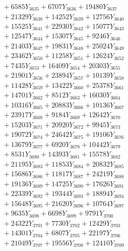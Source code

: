\documentclass[a4paper,10pt]{article}
\begin{document}
{\begin{align}
&\;  + 6585 Y_{3635} + 6707 Y_{3636} + 19480 Y_{3637} \\[0.3ex]
&\;  + 21329 Y_{3638} + 14252 Y_{3639} + 12756 Y_{3640} \\[0.3ex]
&\;  + 15525 Y_{3641} + 22930 Y_{3642} + 15077 Y_{3643} \\[0.3ex]
&\;  + 12547 Y_{3644} + 15307 Y_{3645} + 9246 Y_{3646} \\[0.3ex]
&\;  + 21403 Y_{3647} + 19831 Y_{3648} + 25024 Y_{3649} \\[0.3ex]
&\;  + 23462 Y_{3650} + 11258 Y_{3651} + 12624 Y_{3652} \\[0.3ex]
&\;  + 7435 Y_{3653} + 16409 Y_{3654} + 20303 Y_{3655} \\[0.3ex]
&\;  + 21901 Y_{3656} + 23894 Y_{3657} + 10139 Y_{3658} \\[0.5ex]\allowbreak
&\;  + 11428 Y_{3659} + 13422 Y_{3660} + 25378 Y_{3661} \\[0.3ex]
&\;  + 14701 Y_{3662} + 8512 Y_{3663} + 16030 Y_{3664} \\[0.3ex]
&\;  + 10316 Y_{3665} + 20883 Y_{3666} + 10136 Y_{3667} \\[0.3ex]
&\;  + 23917 Y_{3668} + 9184 Y_{3669} + 12642 Y_{3670} \\[0.3ex]
&\;  + 15203 Y_{3671} + 20920 Y_{3672} + 9945 Y_{3673} \\[0.3ex]
&\;  + 19072 Y_{3674} + 24642 Y_{3675} + 19106 Y_{3676} \\[0.3ex]
&\;  + 13679 Y_{3677} + 6920 Y_{3678} + 10442 Y_{3679} \\[0.3ex]
&\;  + 8531 Y_{3680} + 14393 Y_{3681} + 15578 Y_{3682} \\[0.3ex]
&\;  + 21195 Y_{3683} + 11853 Y_{3684} + 20832 Y_{3685} \\[0.3ex]
&\;  + 15686 Y_{3686} + 11817 Y_{3687} + 24219 Y_{3688} \\[0.5ex]\allowbreak
&\;  + 19136 Y_{3689} + 14725 Y_{3690} + 17626 Y_{3691} \\[0.3ex]
&\;  + 22339 Y_{3692} + 19344 Y_{3693} + 18894 Y_{3694} \\[0.3ex]
&\;  + 15648 Y_{3695} + 21620 Y_{3696} + 10764 Y_{3697} \\[0.3ex]
&\;  + 9635 Y_{3698} + 6698 Y_{3699} + 9791 Y_{3700} \\[0.3ex]
&\;  + 24322 Y_{3701} + 7730 Y_{3702} + 12429 Y_{3703} \\[0.3ex]
&\;  + 14301 Y_{3704} + 6807 Y_{3705} + 22197 Y_{3706} \\[0.3ex]
&\;  + 21049 Y_{3707} + 19556 Y_{3708} + 12410 Y_{3709} \\[0.3ex]

\end{align}}
\end{document}
